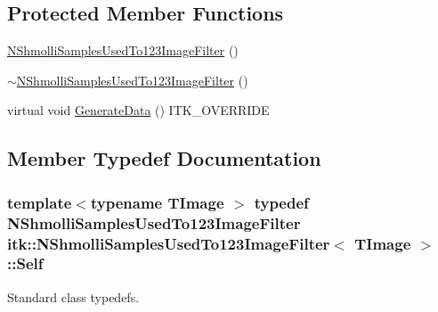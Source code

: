 \subsection*{Protected Member Functions}
\begin{DoxyCompactItemize}
\item 
\hyperlink{classitk_1_1_n_shmolli_samples_used_to123_image_filter_a7ab0731450a68f872c8e2888cf4eee5e}{N\-Shmolli\-Samples\-Used\-To123\-Image\-Filter} ()
\item 
\hyperlink{classitk_1_1_n_shmolli_samples_used_to123_image_filter_ab65e63793d21e7f775dc85eea9a6c168}{$\sim$\-N\-Shmolli\-Samples\-Used\-To123\-Image\-Filter} ()
\item 
virtual void \hyperlink{classitk_1_1_n_shmolli_samples_used_to123_image_filter_a1cd4d595fe98ea551673e4f7a2a8ca9f}{Generate\-Data} () I\-T\-K\-\_\-\-O\-V\-E\-R\-R\-I\-D\-E
\end{DoxyCompactItemize}


\subsection{Member Typedef Documentation}
\hypertarget{classitk_1_1_n_shmolli_samples_used_to123_image_filter_aa227171fdb715a86680dae7b2aeb60ca}{
\subsubsection[{Self}]{\setlength{\rightskip}{0pt plus 5cm}template$<$typename T\-Image $>$ typedef {\bf N\-Shmolli\-Samples\-Used\-To123\-Image\-Filter} {\bf itk\-::\-N\-Shmolli\-Samples\-Used\-To123\-Image\-Filter}$<$ T\-Image $>$\-::{\bf Self}}}\label{classitk_1_1_n_shmolli_samples_used_to123_image_filter_aa227171fdb715a86680dae7b2aeb60ca}
Standard class typedefs. 

